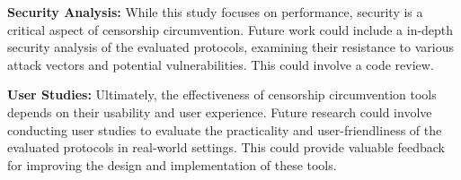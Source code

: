 \noindent\textbf{Security Analysis:}
While this study focuses on performance, security is a critical aspect of censorship circumvention.
Future work could include a  in-depth security analysis of the evaluated protocols, examining their resistance to various attack vectors and potential vulnerabilities.
This could involve a code review.

\noindent\textbf{User Studies:}
Ultimately, the effectiveness of censorship circumvention tools depends on their usability and user experience.
Future research could involve conducting user studies to evaluate the practicality and user-friendliness of the evaluated protocols in real-world settings.
This could provide valuable feedback for improving the design and implementation of these tools.


